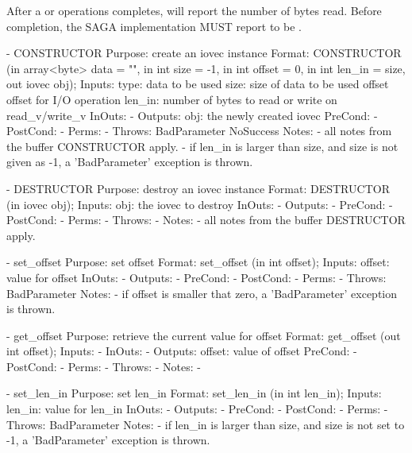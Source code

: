     After a  or  operations
    completes,  will report the number of bytes
    read.  Before completion, the SAGA implementation MUST
    report  to be .
 
 
 \begin{myspec}
    - CONSTRUCTOR
      Purpose:  create an iovec instance
      Format:   CONSTRUCTOR     (in  array<byte> data   = "",
                                 in  int         size   = -1,
                                 in  int         offset = 0,
                                 in  int         len_in = size,
                                 out iovec       obj);
      Inputs:   type:                 data to be used
                size:                 size of data to be used
                offset                offset for I/O operation
                len_in:               number of bytes to read
                                      or write on read_v/write_v
      InOuts:   -
      Outputs:  obj:                  the newly created iovec 
      PreCond:  -
      PostCond: -
      Perms:    - 
      Throws:   BadParameter
                NoSuccess
      Notes:    - all notes from the buffer CONSTRUCTOR apply.
                - if len_in is larger than size, and size is 
                  not given as -1, a 'BadParameter' exception 
                  is thrown.
 
    - DESTRUCTOR
      Purpose:  destroy an iovec instance
      Format:   DESTRUCTOR           (in  iovec obj);
      Inputs:   obj:                  the iovec to destroy
      InOuts:   -
      Outputs:  -
      PreCond:  -
      PostCond: -
      Perms:    - 
      Throws:   - 
      Notes:    - all notes from the buffer DESTRUCTOR apply.
 
    - set_offset
      Purpose:  set offset
      Format:   set_offset           (in  int   offset);
      Inputs:   offset:               value for offset
      InOuts:   -
      Outputs:  -
      PreCond:  -
      PostCond: -
      Perms:    - 
      Throws:   BadParameter
      Notes:    - if offset is smaller that zero, a 
                  'BadParameter' exception is thrown.
 
    - get_offset
      Purpose:  retrieve the current value for offset
      Format:   get_offset           (out int   offset);
      Inputs:   -
      InOuts:   -
      Outputs:  offset:               value of offset
      PreCond:  -
      PostCond: -
      Perms:    - 
      Throws:   -
      Notes:    -
 
    - set_len_in
      Purpose:  set len_in
      Format:   set_len_in           (in  int   len_in);
      Inputs:   len_in:               value for len_in
      InOuts:   -
      Outputs:  -
      PreCond:  -
      PostCond: -
      Perms:    - 
      Throws:   BadParameter
      Notes:    - if len_in is larger than size, and size is 
                  not set to -1, a 'BadParameter' exception 
                  is thrown.
 

\end{myspec}
